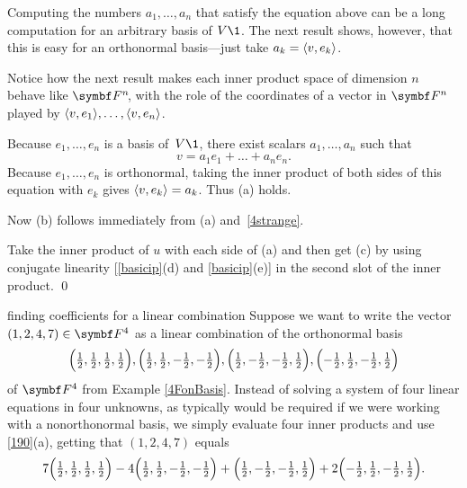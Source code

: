 \noindent Computing the numbers $a_1, \dots, a_n$ that satisfy the equation above can be a long computation for an arbitrary basis of $V\1$. The next result shows, however,
that this is easy for an orthonormal basis---just take
$
a_k = \langle v, e_k\rangle$.


Notice how the next result makes each inner product space of dimension $n$ behave like $\FF{n}$, with the role of the \mbox{coordinates} of a vector in $\F{n}$ played by $\langle v, e_1\rangle, \ldots, \langle v, e_n\rangle$.


\proof
Because $e_1, \dots, e_n$ is a basis of~$V\1$, there exist
scalars $a_1, \dots, a_n$ such that
\[
v = a_1 e_1 + \dots + a_n e_n.
\]
Because $e_1, \dots, e_n$ is orthonormal, taking the inner product of both sides of this equation with $e_k$ gives
\mbox{$\langle v, e_k\rangle = a_k$}.  Thus (a) holds.

Now (b) follows immediately from (a) and~\ref{4strange}.

Take the inner product of $u$ with each side of (a) and then get (c) by using conjugate linearity [\ref{basicip}(d) and \ref{basicip}(e)] in the second slot of the inner product.
\qed

\begin{example}{finding coefficients for a linear combination}
Suppose we want to write the vector $(1,2,4,7) \in \F4$ as a linear combination of the orthonormal basis
\[
\paren[\Big]{\tfrac{1}{2}, \tfrac{1}{2}, \tfrac{1}{2}, \tfrac{1}{2}},
\paren[\Big]{\tfrac{1}{2}, \tfrac{1}{2}, -\tfrac{1}{2}, -\tfrac{1}{2}},
\paren[\Big]{\tfrac{1}{2}, -\tfrac{1}{2}, -\tfrac{1}{2}, \tfrac{1}{2}},
\paren[\Big]{-\tfrac{1}{2}, \tfrac{1}{2}, -\tfrac{1}{2}, \tfrac{1}{2}}
\]
of $\F4$ from Example \ref{4FonBasis}. Instead of solving a system of four linear equations in four unknowns, as typically would be required if we were working with a nonorthonormal basis, we simply evaluate four inner products and use \ref{190}(a), getting that
$(1,2,4,7)$ equals
\[
7 \paren[\Big]{\tfrac{1}{2}, \tfrac{1}{2}, \tfrac{1}{2}, \tfrac{1}{2}}
-4\paren[\Big]{\tfrac{1}{2}, \tfrac{1}{2}, -\tfrac{1}{2}, -\tfrac{1}{2}}
+\paren[\Big]{\tfrac{1}{2}, -\tfrac{1}{2}, -\tfrac{1}{2}, \tfrac{1}{2}}
+2\paren[\Big]{-\tfrac{1}{2}, \tfrac{1}{2}, -\tfrac{1}{2}, \tfrac{1}{2}}.
\]
\exampledisplayend
\end{example}

